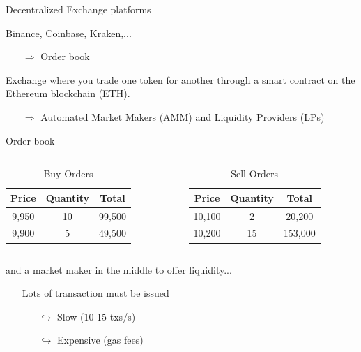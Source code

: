 \documentclass{beamer}
\begin{document}
\begin{frame}{Decentralized Exchange platforms}
\begin{tcolorbox}[enhanced,drop shadow, title= Centralized Exchange]
Binance, Coinbase, Kraken,...
\begin{itemize}
  \item[$\Rightarrow$] Order book
\end{itemize}
\end{tcolorbox}
\begin{tcolorbox}[enhanced,drop shadow, title= Decentralized Exchange]
Exchange where you trade one token for another through a smart contract on the Ethereum blockchain (ETH).
\begin{itemize}
  \item[$\Rightarrow$] Automated Market Makers (AMM) and Liquidity Providers (LPs)
\end{itemize}
\end{tcolorbox}

 \end{frame}
 \begin{frame}{Order book}
 \begin{columns}
    \begin{table}
      \centering
      \caption{Buy Orders}
      \begin{tabular}{ccc}
        \toprule
        Price & Quantity & Total \\
        \midrule
        9,950 & 10 & 99,500 \\
        9,900 & 5 & 49,500 \\
        \bottomrule
      \end{tabular}
    \end{table}
    
    \begin{table}
      \centering
      \caption{Sell Orders}
      \begin{tabular}{ccc}
        \toprule
        Price & Quantity & Total \\
        \midrule
        10,100 & 2 & 20,200 \\
        10,200 & 15 & 153,000 \\
        \bottomrule
      \end{tabular}
    \end{table}
  \end{columns}
  and a market maker in the middle to offer liquidity...
  \pause
  \begin{itemize}
  \item[\danger] Lots of transaction must be issued
  \begin{itemize}
  \item[$\hookrightarrow$] Slow (10-15 txs/s)
  \item[$\hookrightarrow$] Expensive (gas fees)
\end{itemize}
\end{itemize}
  
 \end{frame}
\end{document}
